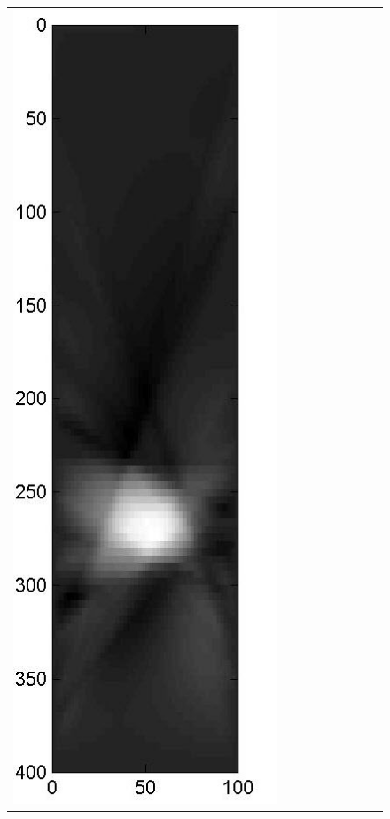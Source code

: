 \documentclass[11pt]{article}
\begin{document}
{\begin{figure}[!h]
\begin{center}
\begin{tabular}{|c|c|c|c|c|c|c|c|c|}
			\includegraphics[width=.9\iwidth]{figures/newFigs/noisy/resultsExp-6-mk}
			&

\end{tabular}
\end{center}
\end{figure}}
\end{document}
